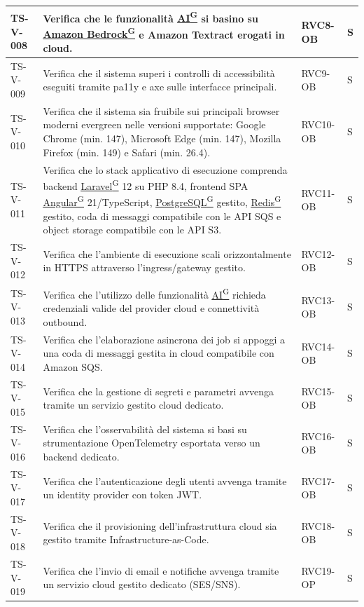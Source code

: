 \documentclass[a4paper,12pt]{article}
\providecommand{\glslink}[2]{\href{https://alittlebyte-19.github.io/Documentazione/glossario.html\#gls-#1}{\underline{#2}\textsuperscript{\scriptsize G}}}
\begin{document}
\begin{longtable}{|p{2.2cm}|p{9.5cm}|p{2.3cm}|p{1.5cm}|}
    \hline
    TS-V-008 & Verifica che le funzionalità \glslink{intelligenza-artificiale-ai}{AI} si basino su \glslink{amazon-bedrock}{Amazon Bedrock} e Amazon Textract erogati in cloud. & RVC8-OB & S \\
    \hline
    TS-V-009 & Verifica che il sistema superi i controlli di accessibilità eseguiti tramite pa11y e axe sulle interfacce principali. & RVC9-OB & S \\
    \hline
    TS-V-010 & Verifica che il sistema sia fruibile sui principali browser moderni evergreen nelle versioni supportate: Google Chrome (min. 147), Microsoft Edge (min. 147), Mozilla Firefox (min. 149) e Safari (min. 26.4). & RVC10-OB & S \\
    \hline
    TS-V-011 & Verifica che lo stack applicativo di esecuzione comprenda backend \glslink{laravel}{Laravel} 12 su PHP 8.4, frontend SPA \glslink{angular}{Angular} 21/TypeScript, \glslink{postgresql}{PostgreSQL} gestito, \glslink{redis}{Redis} gestito, coda di messaggi compatibile con le API SQS e object storage compatibile con le API S3. & RVC11-OB & S \\
    \hline
    TS-V-012 & Verifica che l'ambiente di esecuzione scali orizzontalmente in HTTPS attraverso l'ingress/gateway gestito. & RVC12-OB & S \\
    \hline
    TS-V-013 & Verifica che l'utilizzo delle funzionalità \glslink{intelligenza-artificiale-ai}{AI} richieda credenziali valide del provider cloud e connettività outbound. & RVC13-OB & S \\
    \hline
    TS-V-014 & Verifica che l'elaborazione asincrona dei job si appoggi a una coda di messaggi gestita in cloud compatibile con Amazon SQS. & RVC14-OB & S \\
    \hline
    TS-V-015 & Verifica che la gestione di segreti e parametri avvenga tramite un servizio gestito cloud dedicato. & RVC15-OB & S \\
    \hline
    TS-V-016 & Verifica che l'osservabilità del sistema si basi su strumentazione OpenTelemetry esportata verso un backend dedicato. & RVC16-OB & S \\
    \hline
    TS-V-017 & Verifica che l'autenticazione degli utenti avvenga tramite un identity provider con token JWT. & RVC17-OB & S \\
    \hline
    TS-V-018 & Verifica che il provisioning dell'infrastruttura cloud sia gestito tramite Infrastructure-as-Code. & RVC18-OB & S \\
    \hline
    TS-V-019 & Verifica che l'invio di email e notifiche avvenga tramite un servizio cloud gestito dedicato (SES/SNS). & RVC19-OP & S \\
    \hline
\end{longtable}
\end{document}
